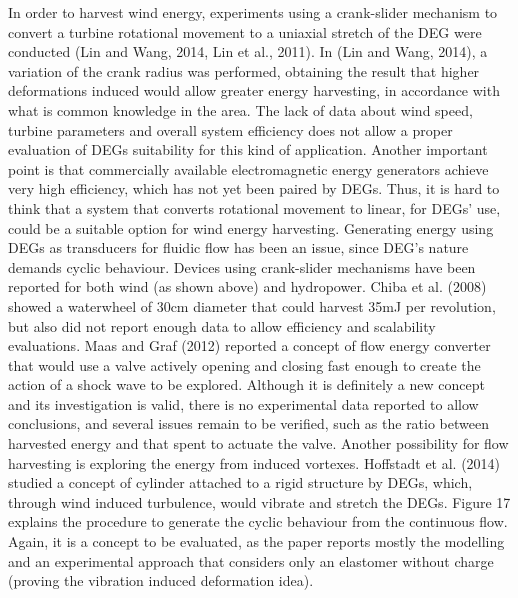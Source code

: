 In order to harvest wind energy, experiments using a crank-slider mechanism to convert a turbine rotational movement to a uniaxial stretch of the DEG were conducted (Lin and Wang, 2014, Lin et al., 2011). In (Lin and Wang, 2014), a variation of the crank radius was performed, obtaining the result that higher deformations induced would allow greater energy harvesting, in accordance with what is common knowledge in the area. The lack of data about wind speed, turbine parameters and overall system efficiency does not allow a proper evaluation of DEGs suitability for this kind of application. Another important point is that commercially available electromagnetic energy generators achieve very high efficiency, which has not yet been paired by DEGs. Thus, it is hard to think that a system that converts rotational movement to linear, for DEGs’ use, could be a suitable option for wind energy harvesting.
Generating energy using DEGs as transducers for fluidic flow has been an issue, since DEG’s nature demands cyclic behaviour. Devices using crank-slider mechanisms have been reported for both wind (as shown above) and hydropower. Chiba et al. (2008) showed a waterwheel of 30cm diameter that could harvest 35mJ per revolution, but also did not report enough data to allow efficiency and scalability evaluations. Maas and Graf (2012) reported a concept of flow energy converter that would use a valve actively opening and closing fast enough to create the action of a shock wave to be explored. Although it is definitely a new concept and its investigation is valid, there is no experimental data reported to allow conclusions, and several issues remain to be verified, such as the ratio between harvested energy and that spent to actuate the valve. Another possibility for flow harvesting is exploring the energy from induced vortexes. Hoffstadt et al. (2014) studied a concept of cylinder attached to a rigid structure by DEGs, which, through wind induced turbulence, would vibrate and stretch the DEGs. Figure 17 explains the procedure to generate the cyclic behaviour from the continuous flow. Again, it is a concept to be evaluated, as the paper reports mostly the modelling and an experimental approach that considers only an elastomer without charge (proving the vibration induced deformation idea).
 
